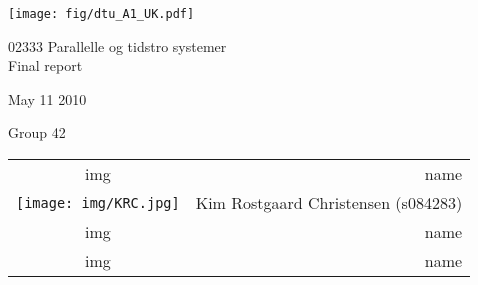
\begin{flushright}
{\texttt{[image: fig/dtu\_A1\_UK.pdf]}}
\par\end{flushright}

\begin{flushright}
\vspace{2in}

\par\end{flushright}

\begin{center}
{\Huge 02333 Parallelle og tidstro systemer\\Final report } 
\par\end{center}



\begin{center}
{\Large May 11 2010} 
\par\end{center}



\begin{center}
Group 42 \\

\par\end{center}

\begin{center}
\begin{tabular}{cr}
 img & name \tabularnewline
 \texttt{[image: img/KRC.jpg]} & Kim Rostgaard Christensen (s084283)\tabularnewline
 img & name \tabularnewline
 img  & name \tabularnewline
\end{tabular}
\par\end{center}
\newpage
